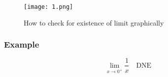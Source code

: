 \documentclass[12pt,a4paper,fleqn]{article}
\begin{document}
\begin{figure}[ht]
    \centering
    \texttt{[image: 1.png]}
    \caption{How to check for existence of limit graphically}
\end{figure}
 \subsubsection*{Example} 
 \begin{equation*}
     \lim_{x \to 0^+} \frac{1}{x} \quad \text{DNE}
 \end{equation*}    
\end{document}

